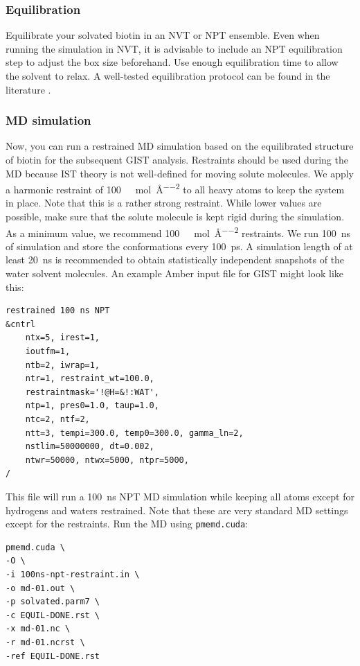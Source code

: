 \documentclass[9pt,tutorial]{livecoms}
\newcommand{\software}{\texttt}
\begin{document}
\subsubsection{Equilibration}
Equilibrate your solvated biotin in an NVT or NPT ensemble.
Even when running the simulation in NVT, it is advisable to include an NPT equilibration step to adjust the box size beforehand.
Use enough equilibration time to allow the solvent to relax. 
A well-tested equilibration protocol can be found in the literature \cite{Roe2020-equilibration}.

\subsubsection{MD simulation}
\label{sec:md_simulation}
Now, you can run a restrained MD simulation based on the equilibrated structure of biotin for the subsequent GIST analysis.
Restraints should be used during the MD because IST theory is not well-defined for moving solute molecules.
We apply a harmonic restraint of \SI{100}{\kilo\calorie\per\mole\per\angstrom\squared} to all heavy atoms to keep the system in place. Note that this is a rather strong restraint. While lower values are possible, make sure that the solute molecule is kept rigid during the simulation. As a minimum value, we recommend \SI{100}{\kilo\calorie\per\mole\per\angstrom\squared} restraints.
We run \SI{100}{\nano\second} of simulation and store the conformations every \SI{100}{\pico\second}.
A simulation length of at least \SI{20}{\nano\second} is recommended to obtain statistically independent snapshots of the water solvent molecules. 
An example Amber input file for GIST might look like this:
\begin{lstlisting}[style=amber-in]
restrained 100 ns NPT
&cntrl
	ntx=5, irest=1,
	ioutfm=1,
	ntb=2, iwrap=1,
	ntr=1, restraint_wt=100.0,
	restraintmask='!@H=&!:WAT',
	ntp=1, pres0=1.0, taup=1.0,
	ntc=2, ntf=2,
	ntt=3, tempi=300.0, temp0=300.0, gamma_ln=2,
	nstlim=50000000, dt=0.002,
	ntwr=50000, ntwx=5000, ntpr=5000,
/
\end{lstlisting}
This file will run a \SI{100}{\nano\second} NPT MD simulation while keeping all atoms except for hydrogens and waters restrained.
Note that these are very standard MD settings except for the restraints.
Run the MD using \software{pmemd.cuda}:
\begin{lstlisting}[style=bash]
pmemd.cuda \
-O \
-i 100ns-npt-restraint.in \
-o md-01.out \
-p solvated.parm7 \
-c EQUIL-DONE.rst \
-x md-01.nc \
-r md-01.ncrst \
-ref EQUIL-DONE.rst
\end{lstlisting}
\end{document}
